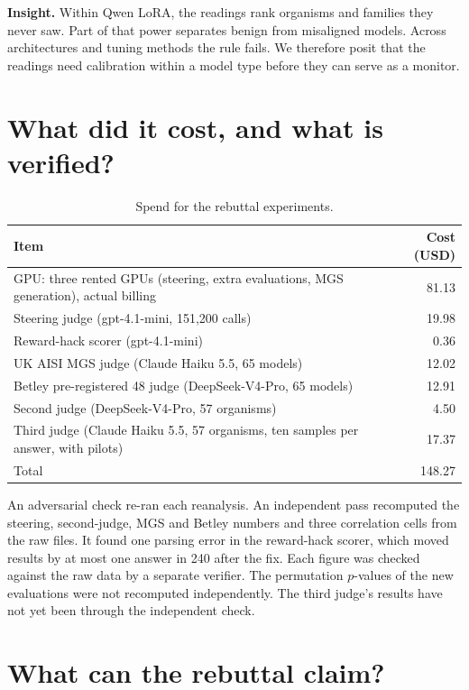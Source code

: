 \documentclass[10pt]{article}
\newcommand{\insight}[1]{\par\smallskip\noindent\colorbox{gray!10}{\parbox{\dimexpr\linewidth-2\fboxsep}{\textbf{Insight.} #1}}\par}
\begin{document}
\insight{Within Qwen LoRA, the readings rank organisms and families they never saw.
Part of that power separates benign from misaligned models.
Across architectures and tuning methods the rule fails.
We therefore posit that the readings need calibration within a model type before they can serve as a monitor.}

\section{What did it cost, and what is verified?}

\begin{table}[H]
\centering\small
\begin{tabularx}{\linewidth}{@{}L r@{}}
\toprule
Item & Cost (USD) \\
\midrule
GPU: three rented GPUs (steering, extra evaluations, MGS generation), actual billing & 81.13 \\
Steering judge (gpt-4.1-mini, 151,200 calls) & 19.98 \\
Reward-hack scorer (gpt-4.1-mini) & 0.36 \\
UK AISI MGS judge (Claude Haiku 5.5, 65 models) & 12.02 \\
Betley pre-registered 48 judge (DeepSeek-V4-Pro, 65 models) & 12.91 \\
Second judge (DeepSeek-V4-Pro, 57 organisms) & 4.50 \\
Third judge (Claude Haiku 5.5, 57 organisms, ten samples per answer, with pilots) & 17.37 \\
\midrule
Total & 148.27 \\
\bottomrule
\end{tabularx}
\caption{Spend for the rebuttal experiments.}
\end{table}

An adversarial check re-ran each reanalysis.
An independent pass recomputed the steering, second-judge, MGS and Betley numbers and three correlation cells from the raw files.
It found one parsing error in the reward-hack scorer, which moved results by at most one answer in 240 after the fix.
Each figure was checked against the raw data by a separate verifier.
The permutation $p$-values of the new evaluations were not recomputed independently.
The third judge's results have not yet been through the independent check.

\section{What can the rebuttal claim?}
\end{document}
